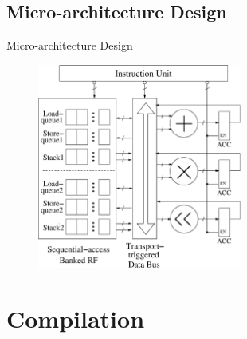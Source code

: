 \documentclass{beamer}
\begin{document}
\begin{CJK}{UTF8}{bkai}
    \subsection{Micro-architecture Design}
    \begin{frame}{Micro-architecture Design}
        \begin{figure}[!ht] 
            \centering
            \includegraphics[width=0.6\textwidth]{./figs/micro.eps}
            \label{fig:micro}
        \end{figure}
    \end{frame}

 
    \section{Compilation}

\end{CJK}
\end{document}
